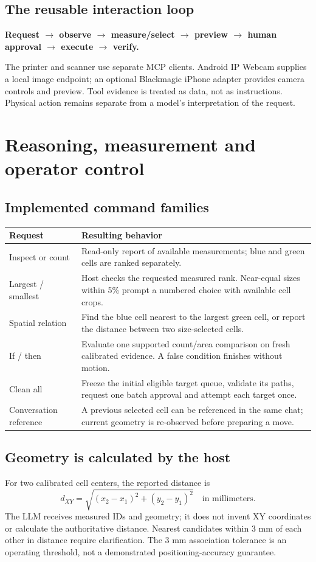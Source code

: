 \documentclass[10pt,a4paper]{article}
\begin{document}
\subsection{The reusable interaction loop}
\textbf{Request $\rightarrow$ observe $\rightarrow$ measure/select $\rightarrow$
preview $\rightarrow$ human approval $\rightarrow$ execute $\rightarrow$ verify.}

The printer and scanner use separate MCP clients. Android IP Webcam supplies a
local image endpoint; an optional Blackmagic iPhone adapter provides camera
controls and preview. Tool evidence is treated as data, not as instructions.
Physical action remains separate from a model's interpretation of the request.

\newpage
\section{Reasoning, measurement and operator control}
\subsection{Implemented command families}
\begin{tabularx}{\linewidth}{@{}p{36mm}Y@{}}
\toprule
\textbf{Request} & \textbf{Resulting behavior}\\\midrule
Inspect or count & Read-only report of available measurements; blue and green cells are ranked separately.\\
Largest / smallest & Host checks the requested measured rank. Near-equal sizes within 5\% prompt a numbered choice with available cell crops.\\
Spatial relation & Find the blue cell nearest to the largest green cell, or report the distance between two size-selected cells.\\
If / then & Evaluate one supported count/area comparison on fresh calibrated evidence. A false condition finishes without motion.\\
Clean all & Freeze the initial eligible target queue, validate its paths, request one batch approval and attempt each target once.\\
Conversation reference & A previous selected cell can be referenced in the same chat; current geometry is re-observed before preparing a move.\\
\bottomrule
\end{tabularx}

\subsection{Geometry is calculated by the host}
For two calibrated cell centers, the reported distance is
\[
 d_{XY}=\sqrt{(x_2-x_1)^2+(y_2-y_1)^2}\quad\text{in millimeters.}
\]
The LLM receives measured IDs and geometry; it does not invent XY coordinates or
calculate the authoritative distance. Nearest candidates within 3 mm of each
other in distance require clarification. The 3 mm association tolerance is an
operating threshold, not a demonstrated positioning-accuracy guarantee.
\end{document}

